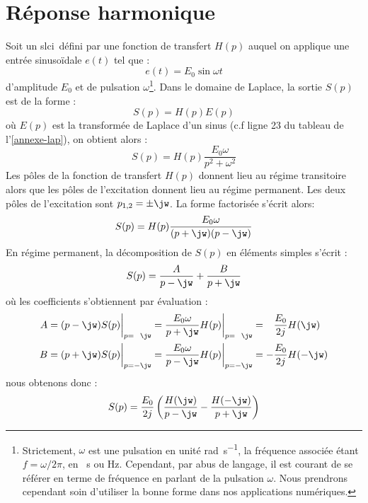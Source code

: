 \section{Réponse harmonique}
Soit un \gls{slci}~défini par une fonction de transfert $H(p)$ auquel on 
applique une entrée sinuso\"idale $e(t)$ tel que :
\[
e(t)=E_0\sin\omega t 
\]
d'amplitude $E_0$ et de pulsation $\omega$\footnote{Strictement, $\omega$ est 
une pulsation en unité \si{\radian\per\second}, la fréquence associée étant 
$f=\omega/2\pi$, en \si{\per\second} ou \si{\hertz}. Cependant, par abus de 
langage, il est courant de se référer en terme de fréquence en parlant de la 
pulsation $\omega$. Nous prendrons cependant soin d'utiliser la bonne forme 
dans nos applications numériques.}. Dans le domaine de Laplace, la sortie $S(p)$
est de la forme :
\[
S(p)=H(p)E(p)
\]
où $E(p)$ est la transformée de Laplace d'un sinus (c.f ligne 23 du tableau de 
l'\cref{annexe-lap}), on obtient alors :
\[
S(p)=H(p)\dfrac{E_0\omega}{p^2+\omega^2}
\]
Les pôles de la fonction de transfert $H(p)$ donnent lieu au 
régime transitoire alors que les pôles de l'excitation donnent 
lieu au régime permanent. 
Les deux pôles de l'excitation sont $p_{1,2}=\pm\jw$. La forme factorisée 
s'écrit alors:
\[
S(p)=H(p)\dfrac{E_0\omega}{(p+\jw)(p-\jw)}
\]
En régime permanent, la décomposition de $S(p)$ en éléments simples s'écrit :
\[
S(p)=\dfrac{A}{p-\jw} + \dfrac{B}{p+\jw}
\]
où les coefficients s'obtiennent par évaluation :
\begin{align*}
    A&=(p-\jw)S(p)\bigg|_{p=\hphantom{-}\jw}=
       \dfrac{E_0\omega}{p+\jw}H(p)\bigg|_{p=\hphantom{-}\jw}=
       \hphantom{-}\dfrac{E_0}{2j}H(\jw)\\
    B&=(p+\jw)S(p)\bigg|_{p=-\jw}=
       \dfrac{E_0\omega}{p-\jw}H(p)\bigg|_{p=-\jw}=
       -\dfrac{E_0}{2j}H(-\jw)
\end{align*}
nous obtenons donc :
\[
S(p)=\dfrac{E_0}{2j}\left(\dfrac{H(\jw)}{p-\jw}-\dfrac{H(-\jw)}{p+\jw} \right)
\]
